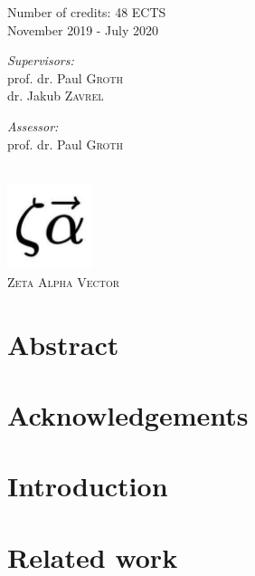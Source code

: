 \documentclass{article}
\begin{document}
\begin{titlepage}
Number of credits: 48 ECTS\\ %
November 2019 - July 2020\\[1cm]%

\noindent
\begin{minipage}[t]{0.4\textwidth}
\begin{flushleft} \large
\emph{Supervisors:} \\
prof. dr. Paul \textsc{Groth}\\
dr. Jakub \textsc{Zavrel}
\end{flushleft}
\end{minipage}
\begin{minipage}[t]{0.4\textwidth}
\begin{flushright} \large
\emph{Assessor:} \\
prof. dr. Paul \textsc{Groth}\\
\end{flushright}
\end{minipage}\\[2cm]


\includegraphics[width=2.5cm]{assets/zeta-alpha-logo.jpg}\\ %
\textsc{\large Zeta Alpha Vector}\\[1.0cm] %
 

\vfill %

\end{titlepage}

\section{Abstract}

\section{Acknowledgements}

\tableofcontents

\section{Introduction}

\section{Related work}
\end{document}
